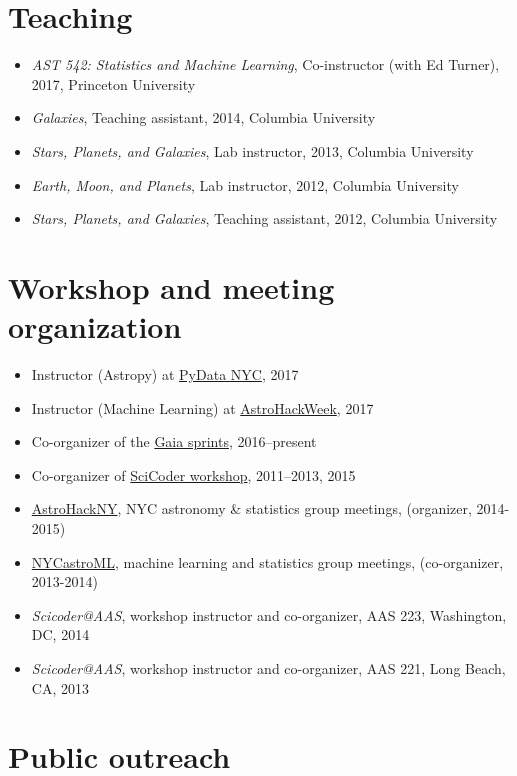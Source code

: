 \documentclass[12pt,letterpaper]{article}
\begin{document}
\section*{Teaching}

\begin{itemize}
	\item \emph{AST 542: Statistics and Machine Learning}, Co-instructor (with Ed Turner), 2017, Princeton University
    \item \emph{Galaxies}, Teaching assistant, 2014, Columbia University
	\item \emph{Stars, Planets, and Galaxies}, Lab instructor, 2013, Columbia University
	\item \emph{Earth, Moon, and Planets}, Lab instructor, 2012, Columbia University
	\item \emph{Stars, Planets, and Galaxies}, Teaching assistant, 2012, Columbia University
\end{itemize}

\section*{Workshop and meeting organization}

\begin{itemize}
    \item Instructor (Astropy) at \href{pydata.org/nyc2017}{PyData NYC}, 2017
    \item Instructor (Machine Learning) at \href{http://astrohackweek.org}{AstroHackWeek}, 2017
    \item Co-organizer of the \href{http://gaia.lol}{Gaia sprints}, 2016--present
    \item Co-organizer of \href{http://scicoder.org}{SciCoder workshop}, 2011--2013, 2015
    \item \href{https://groups.google.com/forum/#!forum/astrohackny}{AstroHackNY}, NYC astronomy \& statistics group meetings, (organizer, 2014-2015)
    \item \href{https://github.com/adrn/nycastroml}{NYCastroML}, machine learning and statistics group meetings, (co-organizer, 2013-2014)
    \item \emph{Scicoder@AAS}, workshop instructor and co-organizer, AAS 223, Washington, DC, 2014
    \item \emph{Scicoder@AAS}, workshop instructor and co-organizer, AAS 221, Long Beach, CA, 2013
\end{itemize}

\section*{Public outreach}
\end{document}
